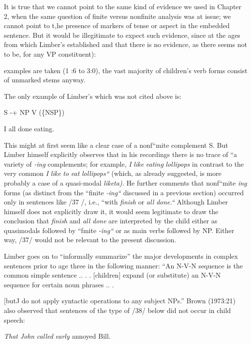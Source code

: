 It is true that we cannot point to the same kind of evidence
we used in Chapter 2, when the same question of finite versus non\-finite analysis was at issue; we cannot point to t,he presence of markers of tense or aspect in the embedded sentence. But it would be illegiti\-mate to expect such evidence, since at the ages from which Limber's
established and that there is no evidence, as there seems not to be, for any VP constituent):

examples are taken (1 :6 to 3:0), the vast majority of children's verb forms consist of unmarked stems anyway.

The only example of Limber's which was not cited above is:

\ea\label{ex:39}
 S -+ NP V
(\{NSP\})
\z


\ea\label{ex:37}
 I all done eating.
\z

This might at first seem like a clear case of a nonf``mite complement S. But Limber himself explicitly observes that in his recordings there is no trace of ``a variety of \textit{-ing} complements; for example, \textit{I} \textit{like} \textit{eating} \textit{lollipops} in contrast to the very common \textit{I} \textit{like} \textit{to} \textit{eat} \textit{lollipops``} (which, as already suggested, is more probably a case of a quasi-modal \textit{liketa).} He further comments that nonf``mite \textit{i}\textit{n}\textit{g} forms (as distinct from the ``finite \textit{-ing``} discussed in a previous section) occurred only in sentences like /37 /, i.e., ``with \textit{finish} or \textit{all} \textit{d}\textit{one.``} Although Limber himself does not explicitly draw it, it would seem legitimate to draw the conclusion that \textit{finish} and \textit{all} \textit{done} are interpreted by the child either as quasi\-modals followed by ``fmite \textit{-i}\textit{n}\textit{g``} or as main verbs followed by NP. Either way, /37/ would not be relevant to the present discussion.

Limber goes on to ``informally summarize'' the major develop\-ments in complex sentences prior to age three in the following manner: ``An N-V-N sequence is the common simple sentence .. . . [children] expand (or substitute) an N-V-N sequence for certain noun phrases .. .

[butJ do not apply syntactic operations to any subject NPs.'' Brown
(1973:21) also observed that sentences of the type of /38/ below did not occur in child speech:

\ea\label{ex:38}
 \textit{That} \textit{John} \textit{called} \textit{early} annoyed Bill.
\glt
\z

